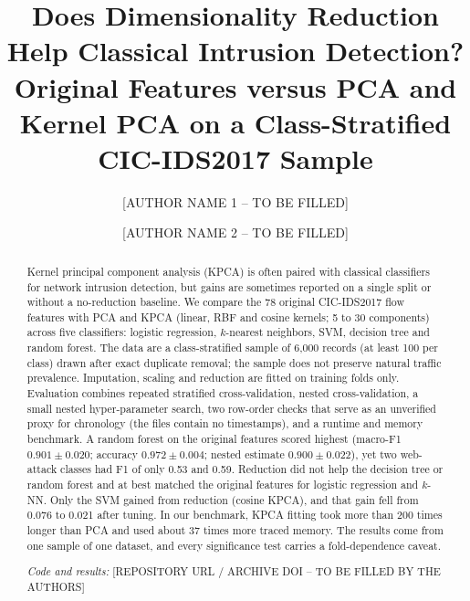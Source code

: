 \documentclass[runningheads]{llncs}
\begin{document}
\title{Does Dimensionality Reduction Help Classical Intrusion Detection? Original Features versus PCA and Kernel PCA on a Class-Stratified CIC-IDS2017 Sample}
\author{[AUTHOR NAME 1 -- TO BE FILLED] \and [AUTHOR NAME 2 -- TO BE FILLED]}
\maketitle
\begin{abstract}
Kernel principal component analysis (KPCA) is often paired with classical classifiers for network intrusion detection, but gains are sometimes reported on a single split or without a no-reduction baseline. We compare the 78 original CIC-IDS2017 flow features with PCA and KPCA (linear, RBF and cosine kernels; 5 to 30 components) across five classifiers: logistic regression, $k$-nearest neighbors, SVM, decision tree and random forest. The data are a class-stratified sample of 6,000 records (at least 100 per class) drawn after exact duplicate removal; the sample does not preserve natural traffic prevalence. Imputation, scaling and reduction are fitted on training folds only. Evaluation combines repeated stratified cross-validation, nested cross-validation, a small nested hyper-parameter search, two row-order checks that serve as an unverified proxy for chronology (the files contain no timestamps), and a runtime and memory benchmark. A random forest on the original features scored highest (macro-F1 $0.901\pm0.020$; accuracy $0.972\pm0.004$; nested estimate $0.900\pm0.022$), yet two web-attack classes had F1 of only 0.53 and 0.59. Reduction did not help the decision tree or random forest and at best matched the original features for logistic regression and $k$-NN. Only the SVM gained from reduction (cosine KPCA), and that gain fell from 0.076 to 0.021 after tuning. In our benchmark, KPCA fitting took more than 200 times longer than PCA and used about 37 times more traced memory. The results come from one sample of one dataset, and every significance test carries a fold-dependence caveat.

\vspace{2pt}\noindent\textit{Code and results:} [REPOSITORY URL / ARCHIVE DOI -- TO BE FILLED BY THE AUTHORS]
\end{abstract}
\end{document}
